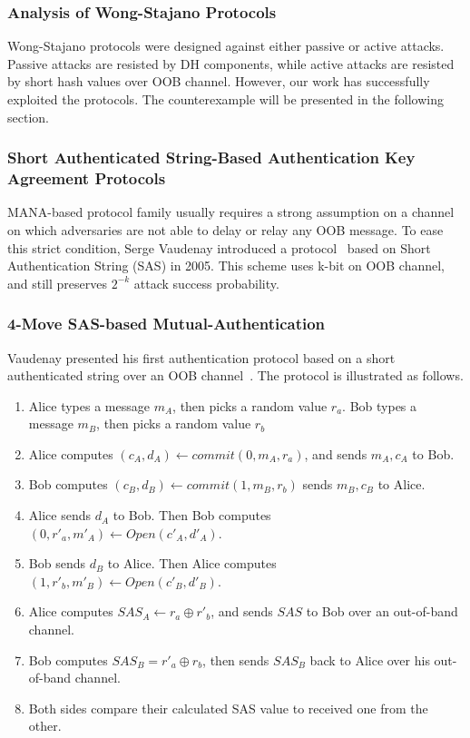 \subsubsection*{Analysis of Wong-Stajano Protocols}

Wong-Stajano protocols were designed against either passive or active attacks. Passive attacks are resisted by DH components, while active attacks are resisted by short hash values over OOB channel. However, our work has successfully exploited the protocols. The counterexample will be presented in the following section. 

\subsubsection{Short Authenticated String-Based Authentication Key Agreement Protocols}

MANA-based protocol family usually requires a strong assumption on a channel on which adversaries are not able to delay or relay any OOB message. To ease this strict condition, Serge Vaudenay introduced a protocol~\cite{Vaudenay:2005qa} based on Short Authentication String (SAS) in 2005. This scheme uses k-bit on OOB channel, and still preserves $2^{-k}$ attack success probability.

\subsubsection*{4-Move SAS-based Mutual-Authentication}

Vaudenay presented his first authentication protocol based on a short authenticated string over an OOB channel~\cite{Vaudenay:2005qa}. The protocol is illustrated as follows.

\begin{enumerate}
\item Alice types a message $m_A$, then picks a random value $r_a$. Bob types a message $m_B$, then picks a random value $r_b$
\item Alice computes $(c_A,d_A) \leftarrow commit(0,m_A,r_a)$, and sends $m_A, c_A$ to Bob.
\item Bob computes $(c_B,d_B) \leftarrow commit(1,m_B,r_b)$ sends $m_B, c_B$ to Alice.
\item Alice sends $d_A$ to Bob. Then Bob computes $(0,r'_a,m'_A) \leftarrow Open(c'_A,d'_A)$. 
\item Bob sends $d_B$ to Alice. Then Alice computes $(1,r'_b,m'_B) \leftarrow Open(c'_B,d'_B)$. 
\item Alice computes $SAS_A \leftarrow r_a \oplus r'_b$, and sends $SAS$ to Bob over an out-of-band channel. 
\item Bob computes $SAS_B = r'_a \oplus r_b$, then sends $SAS_B$ back to Alice over his out-of-band channel. 
\item Both sides compare their calculated SAS value to received one from the other. 
\end{enumerate}

